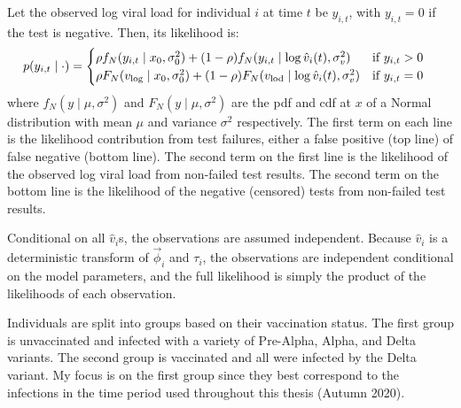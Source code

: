 \documentclass[thesis.tex]{subfiles}
\begin{document}
Let the observed log viral load for individual $i$ at time $t$ be $y_{i,t}$, with $y_{i,t}=0$ if the test is negative.
Then, its likelihood is:
\begin{align}
p(y_{i,t} \mid \cdot) &= \begin{cases}
    \rho f_N(y_{i,t} \mid x_0, \sigma_0^2) + (1 - \rho) f_N(y_{i,t} \mid \log \hat{v}_i(t), \sigma_v^2) & \text{if $y_{i,t} > 0$}\\
    \rho F_N(v_\text{log} \mid x_0, \sigma_0^2) + (1 - \rho) F_N(v_\text{lod} \mid \log \hat{v}_i(t), \sigma_v^2) & \text{if $y_{i,t} = 0$} \label{ATACCC:eq:hakki-likelihood}
\end{cases}
\end{align}
where $f_N(y \mid \mu, \sigma^2)$ and $F_N(y \mid \mu, \sigma^2)$ are the pdf and cdf at $x$ of a Normal distribution with mean $\mu$ and variance $\sigma^2$ respectively.
The first term on each line is the likelihood contribution from test failures, either a false positive (top line) of false negative (bottom line).
The second term on the first line is the likelihood of the observed log viral load from non-failed test results.
The second term on the bottom line is the likelihood of the negative (censored) tests from non-failed test results.

Conditional on all $\hat{v}_i$s, the observations are assumed independent.
Because $\hat{v}_i$ is a deterministic transform of $\vec{\phi}_i$ and $\tau_i$, the observations are independent conditional on the model parameters, and the full likelihood is simply the product of the likelihoods of each observation.

Individuals are split into groups based on their vaccination status.
The first group is unvaccinated and infected with a variety of Pre-Alpha, Alpha, and Delta variants.
The second group is vaccinated and all were infected by the Delta variant.
My focus is on the first group since they best correspond to the infections in the time period used throughout this thesis (Autumn 2020).
\end{document}
